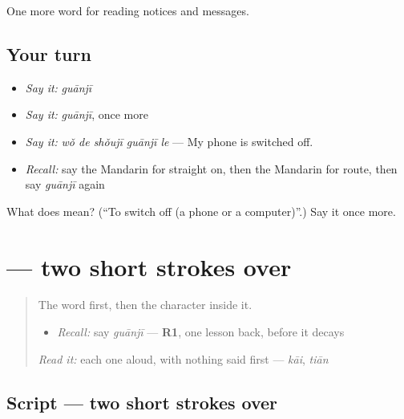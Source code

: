 \begin{grammarlens}[title={What you've built}]
One more word for reading notices and messages.
\end{grammarlens}

\subsection*{Your turn}
\begin{itemize}
\raggedright
  \item \emph{Say it:} \emph{guānjī}
  \item \emph{Say it:} \emph{guānjī}, once more
  \item \emph{Say it:} \emph{wǒ de shǒujī guānjī le} — My phone is switched off.
  \item \emph{Recall:} say the Mandarin for straight on, then the Mandarin for route, then say \emph{guānjī} again
\end{itemize}

\begin{tcolorbox}[breakable,colback=teal!4,colframe=teal!35!black,title={Before you move on}]
What does  mean? (\textquotedblleft{}To switch off (a phone or a computer)\textquotedblright{}.) Say it once more.
\end{tcolorbox}
\section[\texorpdfstring{\zh{关} (guān)}{关 (guān)}]{ — two short strokes over }

\label{lesson:ZH-W198-guan-shut}



\begin{quote}
The word first, then the character inside it.

\begin{itemize}
\raggedright
  \item \emph{Recall:} say \emph{guānjī} — \textbf{R1}, one lesson back, before it decays
\end{itemize}

\begin{quote}
 
\end{quote}

\emph{Read it:} each one aloud, with nothing said first — \emph{kāi}, \emph{tiān}
\end{quote}

\subsection*{Script — two short strokes over }

